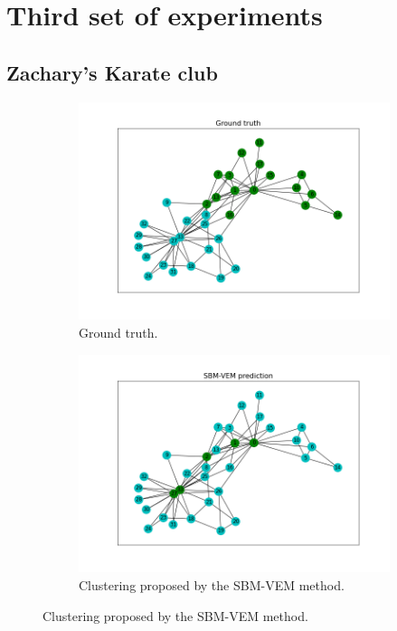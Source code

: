 \documentclass[switch, 12pt]{article}
\begin{document}
\newpage

\section{Third set of experiments}
\label{app:real}

\subsection{Zachary's Karate club}
\label{app:zachary}

\hphantom{.}

\begin{figure}[h]
    \centering
    \begin{subfigure}{0.42\linewidth}
        \centering
        \includegraphics[width=\linewidth, trim={45 35 35 60}, clip]{figures/karate_club_gt.png}
        \caption{Ground truth.}
        \label{fig:zachary_gt}
    \end{subfigure}
    \hspace{1em}
    \begin{subfigure}{0.42\linewidth}
        \centering
        \includegraphics[width=\linewidth, trim={45 35 35 60}, clip]{figures/karate_club_sbm.png}
        \caption{Clustering proposed by the SBM-VEM method.}
        \label{fig:zachary_SBM}
    \end{subfigure}


\end{figure}
\end{document}
